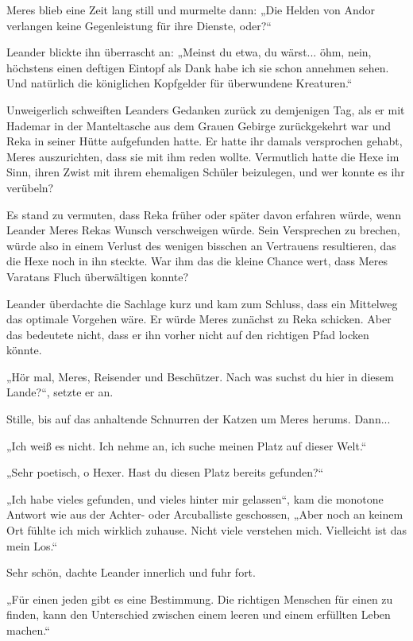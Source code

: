Meres blieb eine Zeit lang still und murmelte dann: „Die Helden von Andor verlangen keine Gegenleistung für ihre Dienste, oder?“

Leander blickte ihn überrascht an: „Meinst du etwa, du wärst... öhm, nein, höchstens einen deftigen Eintopf als Dank habe ich sie schon annehmen sehen. Und natürlich die königlichen Kopfgelder für überwundene Kreaturen.“

Unweigerlich schweiften Leanders Gedanken zurück zu demjenigen Tag, als er mit Hademar in der Manteltasche aus dem Grauen Gebirge zurückgekehrt war und Reka in seiner Hütte aufgefunden hatte. Er hatte ihr damals versprochen gehabt, Meres auszurichten, dass sie mit ihm reden wollte. Vermutlich hatte die Hexe im Sinn, ihren Zwist mit ihrem ehemaligen Schüler beizulegen, und wer konnte es ihr verübeln?

Es stand zu vermuten, dass Reka früher oder später davon erfahren würde, wenn Leander Meres Rekas Wunsch verschweigen würde. Sein Versprechen zu brechen, würde also in einem Verlust des wenigen bisschen an Vertrauens resultieren, das die Hexe noch in ihn steckte. War ihm das die kleine Chance wert, dass Meres Varatans Fluch überwältigen konnte?

Leander überdachte die Sachlage kurz und kam zum Schluss, dass ein Mittelweg das optimale Vorgehen wäre. Er würde Meres zunächst zu Reka schicken. Aber das bedeutete nicht, dass er ihn vorher nicht auf den richtigen Pfad locken könnte.

„Hör mal, Meres, Reisender und Beschützer. Nach was suchst du hier in diesem Lande?“, setzte er an.

Stille, bis auf das anhaltende Schnurren der Katzen um Meres herums. Dann...

„Ich weiß es nicht. Ich nehme an, ich suche meinen Platz auf dieser Welt.“

„Sehr poetisch, o Hexer. Hast du diesen Platz bereits gefunden?“

„Ich habe vieles gefunden, und vieles hinter mir gelassen“, kam die monotone Antwort wie aus der Achter- oder Arcuballiste geschossen, „Aber noch an keinem Ort fühlte ich mich wirklich zuhause. Nicht viele verstehen mich. Vielleicht ist das mein Los.“

Sehr schön, dachte Leander innerlich und fuhr fort.

„Für einen jeden gibt es eine Bestimmung. Die richtigen Menschen für einen zu finden, kann den Unterschied zwischen einem leeren und einem erfüllten Leben machen.“

